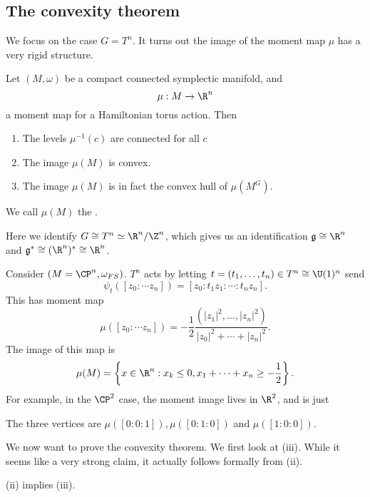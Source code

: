 \documentclass[a4paper]{article}
\begin{document}
\subsection{The convexity theorem}
We focus on the case $G = T^n$. It turns out the image of the moment map $\mu$ has a very rigid structure.

\begin{thm}
  Let $(M, \omega)$ be a compact connected symplectic manifold, and
  \[
    \mu: M \to \R^n
  \]
  a moment map for a Hamiltonian torus action. Then
  \begin{enumerate}
    \item The levels $\mu^{-1}(c)$ are connected for all $c$
    \item The image $\mu(M)$ is convex.
    \item The image $\mu(M)$ is in fact the convex hull of $\mu(M^G)$.
  \end{enumerate}
  We call $\mu(M)$ the .
\end{thm}
Here we identify $G \cong T^n \simeq \R^n/\Z^n$, which gives us an identification $\mathfrak{g} \cong \R^n$ and $\mathfrak{g}^* \cong (\R^n)^* \cong\R^n$.

\begin{eg}
  Consider $(M = \CP^n, \omega_{FS})$. $T^n$ acts by letting $t = (t_1, \ldots, t_n) \in T^n \cong \U(1)^n$ send
  \[
    \psi_t([z_0: \cdots z_n]) = [z_0: t_1 z_1: \cdots :t_n z_n].
  \]
  This has moment map
  \[
    \mu([z_0: \cdots z_n]) = -\frac{1}{2} \frac{(|z_1|^2, \ldots, |z_n|^2)}{|z_0|^2 + \cdots + |z_n|^2}.
  \]
  The image of this map is
  \[
    \mu(M) = \left\{x \in \R^n: x_k \leq 0, x_1 + \cdots + x_n \geq -\frac{1}{2}\right\}.
  \]
  For example, in the $\CP^2$ case, the moment image lives in $\R^2$, and is just
  \begin{center}
  \end{center}
  The three vertices are $\mu([0:0:1]), \mu([0:1:0])$ and $\mu([1:0:0])$.
\end{eg}

We now want to prove the convexity theorem. We first look at (iii). While it seems like a very strong claim, it actually follows formally from (ii).
\begin{lemma}
  (ii) implies (iii).
\end{lemma}
\end{document}
